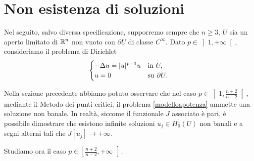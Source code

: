 \section{Non esistenza di soluzioni}
Nel seguito, salvo diversa specificazione, supporremo sempre che $n\ge3$, $U$ sia un aperto limitato di $\mathbb{R}^n$ non vuoto con $\partial U$ di classe $C^\infty$. Dato $p \in \left] 1,+\infty\right[$, consideriamo il problema di Dirichlet
\begin{equation}\label{modelloapotenza}
\begin{cases}
	-\Delta u = \lvert u\rvert^{p-1}u & \textup{in } U,\\
	u = 0 & \textup{su } \partial U.
\end{cases}
\end{equation}

Nella sezione precedente abbiamo potuto osservare che nel caso $p \in \left] 1,\frac{n+2}{n-2}\right[$, mediante il Metodo dei punti critici, il problema \eqref{modelloapotenza} ammette una soluzione non banale. In realtà, siccome il funzionale $J$ associato è pari, è possibile dimostrare che esistono infinite soluzioni $u_j \in H^1_0(U)$ non banali e a segni alterni tali che $J[u_j]\to +\infty$.

Studiamo ora il caso  $p \in \left[ \frac{n+2}{n-2}, +\infty\right[$.

